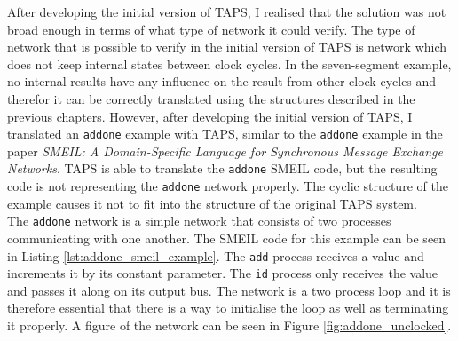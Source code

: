 After developing the initial version of TAPS, I realised that the solution was not broad enough in terms of what type of network it could verify. The type of network that is possible to verify in the initial version of TAPS is network which does not keep internal states between clock cycles. In the seven-segment example, no internal results have any influence on the result from other clock cycles and therefor it can be correctly translated using the structures described in the previous chapters.
However, after developing the initial version of TAPS, I translated an \texttt{addone} example with TAPS, similar to the \texttt{addone} example in the paper \textit{SMEIL: A Domain-Specific Language for
Synchronous Message Exchange Networks}\cite{smeil}. TAPS is able to translate the \texttt{addone} SMEIL code, but the resulting \cspm{} code is not representing the \texttt{addone} network properly. The cyclic structure of the example causes it not to fit into the structure of the original TAPS system.\\

The \texttt{addone} network is a simple network that consists of two processes communicating with one another. The SMEIL code for this example can be seen in Listing \ref{lst:addone_smeil_example}. The \texttt{add} process receives a value and increments it by its constant parameter. The \texttt{id} process only receives the value and passes it along on its output bus.
The network is a two process loop and it is therefore essential that there is a way to initialise the loop as well as terminating it properly. %
A figure of the network can be seen in Figure \ref{fig:addone_unclocked}.\\

